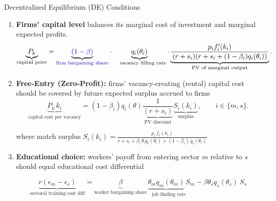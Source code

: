\documentclass[9pt,xcolor={svgnames}]{beamer}
\begin{document}
\begin{frame}{Decentralized Equilibrium (DE) Conditions}
  \begin{enumerate}

\item \textbf{Firms' capital level}  balances its marginal cost of investment and marginal expected profits.
\begin{equation*}
\underbrace{   P_k}_{\text{capital price} }  =\underbrace{\textcolor{blue}{(1-\beta)}}_{\text{\textcolor{blue}{firm bargaining share}}} \cdot \underbrace{q_i(\theta_i)}_{\quad \text{vacancy filling rate}} \cdot \underbrace{\frac{p_i  f_i'(k_i)}{\,(r+s_i)(r+s_i+(1-\beta_i)q_i(\theta_i))\,}}_{\text{PV of marginal output}}.
\end{equation*}


    \item \textbf{Free‐Entry (Zero‐Profit):} firms' vacancy-creating (rental) capital cost should be covered by future expected surplus accrued to firms
      \begin{equation*}
           \underbrace{    P_{k}\,k_i}_{\text{capital cost per vacancy}}
=  (1-\beta_i) q_i(\theta) \frac{1}{\underbrace{(r+s_i)}_{\text{PV discount}}} \underbrace{S_i(k_i)}_{\text{surplus}},
\qquad i \in \{m,s\}.
      \end{equation*}

 where match surplus $S_i(k_i) = \frac{ p_i\,f_i(k_i)}{r+s_i + \beta_i\,\theta_i q_i(\theta_i) + (1-\beta_i)\,q_i(\theta_i)} $  


\vspace{2mm}

 \item \textbf{Educational choice:} workers' payoff from entering sector $m$ relative to $s$ should equal educational cost differential
  
    \begin{equation*}
         \underbrace{     r(\epsilon_m - \epsilon_s)}_{\text{sectoral training cost diff}}= \underbrace{\beta}_{\text{worker bargaining share}} \underbrace{\theta_m q_m(\theta_m)}_{\quad \text{job finding rate}}  S_m - \beta \theta_s q_s(\theta_s)\ S_s
    \end{equation*}
  
 \end{enumerate}
  
\end{frame}
\end{document}
